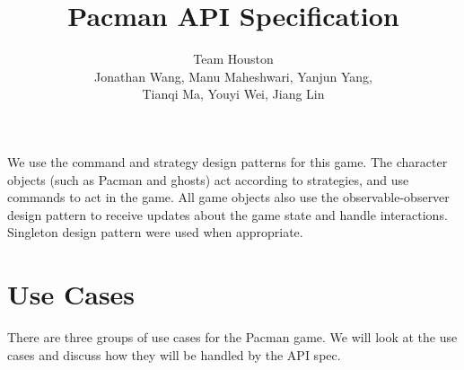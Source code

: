 \documentclass[letterpaper, 11pt]{article}
\title{Pacman API Specification}
\author{Team Houston\\ Jonathan Wang, Manu Maheshwari, Yanjun Yang,\\ Tianqi Ma, Youyi Wei, Jiang Lin}
\date{}
\begin{document}
\maketitle
We use the command and strategy design patterns for this game. The character objects (such as Pacman and ghosts) act according to strategies, and use commands to act in the game. All game objects also use the observable-observer design pattern to receive updates about the game state and handle interactions. Singleton design pattern were used when appropriate.

\section{Use Cases}
There are three groups of use cases for the Pacman game. We will look at the use cases and discuss how they will be handled by the API spec.
\end{document}
